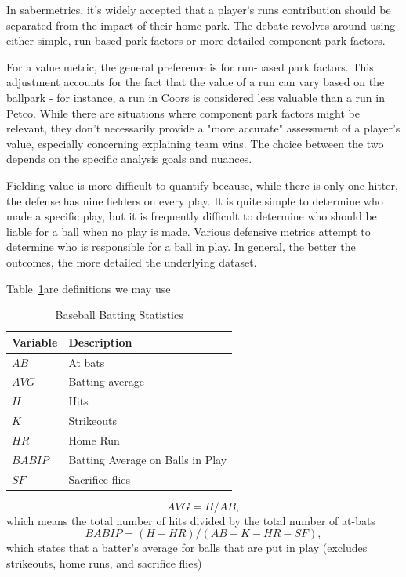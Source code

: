 \documentclass[12pt]{article}
\begin{document}
In sabermetrics, it's widely accepted that a player's runs contribution should be separated from the 
impact of their home park. The debate revolves around using either simple, run-based park factors or more 
detailed component park factors.

For a value metric, the general preference is for run-based park factors. This adjustment accounts 
for the fact that the value of a run can vary based on the ballpark - for instance, a run in Coors is 
considered less valuable than a run in Petco. While there are situations where component park factors might 
be relevant, they don't necessarily provide a "more accurate" assessment of a player's value, especially 
concerning explaining team wins. The choice between the two depends on the specific analysis goals and nuances.

Fielding value is more difficult to quantify because, while there is only one hitter, the defense has nine 
fielders on every play. It is quite simple to determine who made a specific play, but it is frequently 
difficult to determine who should be liable for a ball when no play is made. Various defensive metrics attempt 
to determine who is responsible for a ball in play. In general, the better the outcomes, the more detailed the 
underlying dataset.

Table~\ref*{tab:discription}are definitions we may use 
\begin{table}[htbp]
  \caption{Baseball Batting Statistics}
  \label{tab:discription} 
  \centering
  \begin{tabular}{|l|l|}
     \hline
     \textbf{Variable} & \textbf{Description}\\
     \hline
     $AB$ & At bats\\
     $AVG$ & Batting average\\
     $H$ & Hits\\
     $K$ & Strikeouts\\
     $HR$ & Home Run\\
     $BABIP$ & Batting Average on Balls in Play\\
     $SF$ & Sacrifice flies\\
    \hline
  \end{tabular}
\end{table}

\begin{equation}
  \label{eq:AVG}
  AVG = H/AB,
\end{equation}
which means the total number of hits divided by the total number of at-bats
\begin{equation}
  \label{eq:BABIP}
  BABIP = (H - HR) / (AB - K - HR - SF),
\end{equation}
which states that a batter's average for balls that are put in play (excludes strikeouts, home runs, and 
sacrifice flies)
\end{document}
